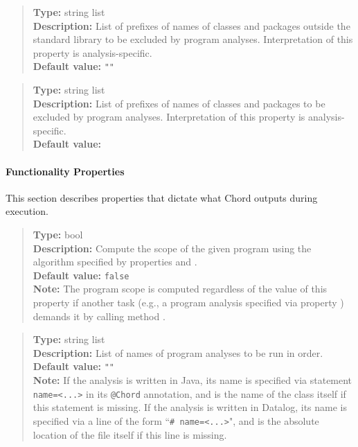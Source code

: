 \begin{quote}
{\bf Type:} string list \\
{\bf Description:} List of prefixes of names of classes and packages outside the standard library to be excluded by program analyses.  Interpretation of this property is analysis-specific. \\
{\bf Default value:} {\tt ""}
\end{quote}

\begin{quote}
{\bf Type:} string list \\
{\bf Description:} List of prefixes of names of classes and packages to be excluded by program analyses.  Interpretation of this property is analysis-specific. \\
{\bf Default value:} 
\end{quote}

\paragraph{Functionality Properties}

This section describes properties that dictate what Chord outputs during execution.

\begin{quote}
{\bf Type:} bool \\
{\bf Description:} Compute the scope of the given program using the algorithm specified by properties  and . \\
{\bf Default value:} {\tt false} \\
{\bf Note:} The program scope is computed regardless of the value of this property if another task (e.g., a program analysis specified via property ) demands it by calling method . 
\end{quote}

\begin{quote}
{\bf Type:} string list  \\
{\bf Description:} List of names of program analyses to be run in order. \\
{\bf Default value:} {\tt ""} \\
{\bf Note:} If the analysis is written in Java, its name is specified via statement {\tt name=<...>} in its {\tt @Chord} annotation, and is the name of the class itself if this statement is missing.  If the analysis is written in Datalog, its name is specified via a line of the form ``{\tt \# name=<...>}", and is the absolute location of the file itself if this line is missing. 
\end{quote}

